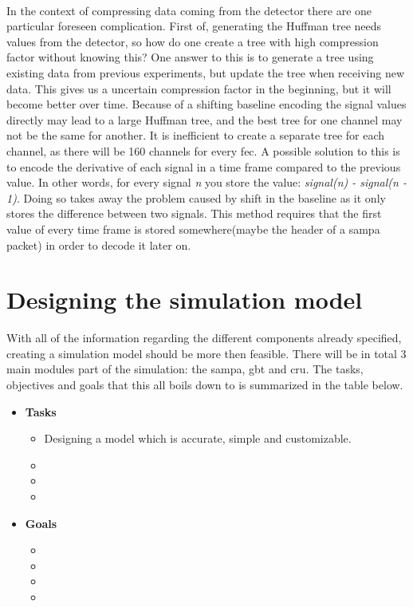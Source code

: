 \documentclass[a4paper]{report}
\begin{document}
\paragraph{} %
In the context of compressing data coming from the detector there are one particular foreseen complication.
First of, generating the Huffman tree needs values from the detector, so how do one create a tree with high compression factor without knowing this?
One answer to this is to generate a tree using existing data from previous experiments, but update the tree when receiving new data.
This gives us a uncertain compression factor in the beginning, but it will become better over time.
Because of a shifting baseline encoding the signal values directly may lead to a large Huffman tree, and the best tree for one channel may not be the same for another.
It is inefficient to create a separate tree for each channel, as there will be 160 channels for every \gls{fec}.
A possible solution to this is to encode the derivative of each signal in a time frame compared to the previous value.
In other words, for every signal \textit{n} you store the value: \textit{signal(n) - signal(n - 1)}.
Doing so takes away the problem caused by shift in the baseline as it only stores the difference between two signals.
This method requires that the first value of every time frame is stored somewhere(maybe the header of a \gls{sampa} packet) in order to decode it later on.

\section{Designing the simulation model}
With all of the information regarding the different components already specified, creating a simulation model should be more then feasible.
There will be in total 3 main modules part of the simulation: the \gls{sampa}, \gls{gbt} and \gls{cru}.
The tasks, objectives and goals that this all boils down to is summarized in the table below.

\begin{itemize}
	\item \textbf{Tasks}
		\begin{itemize}
			\item Designing a model which is accurate, simple and customizable.
			\item
			\item
			\item
		\end{itemize}
	\item \textbf{Goals}
	\begin{itemize}
		\item
		\item
		\item
		\item
	\end{itemize}
\end{itemize}
\end{document}
